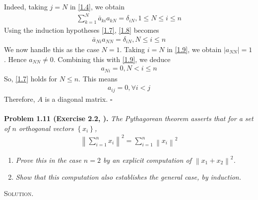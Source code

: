 \documentclass[a4paper,oneside]{book}
\numberwithin{equation}{chapter}
\begin{document}
Indeed, taking $j=N$ in \eqref{1.4}, we obtain
\begin{align}
\label{1.8}
\sum\limits_{k = 1}^N {{{\bar a}_{ki}}{a_{kN}}}  = {\delta _{iN}},1 \le N \le i \le n
\end{align}
Using the induction hypotheses \eqref{1.7}, \eqref{1.8} becomes
\begin{align}
\label{1.9}
{{\bar a}_{Ni}}{a_{NN}} = {\delta _{iN}},N \le i \le n
\end{align}
We now handle this as the case $N=1$. Taking $i=N$ in \eqref{1.9}, we obtain $\left| {{a_{NN}}} \right| = 1$. Hence $a_{NN} \ne 0$. Combining this with \eqref{1.9}, we deduce 
\begin{align}
{a_{Ni}} = 0,N < i \le n
\end{align}
So, \eqref{1.7} holds for $N \le n$. This means
\begin{align}
{a_{ij}} = 0,\forall i < j
\end{align}
Therefore, $A$ is a diagonal matrix. \hfill $\square$\\
\\
\textbf{Problem 1.11 (Exercise 2.2, \cite{1}).} \textit{The Pythagorean theorem asserts that for a set of $n$ orthogonal vectors $\left\{x_i\right\}$,}
\begin{align}
{\left\| {\sum\limits_{i = 1}^n {{x_i}} } \right\|^2} = \sum\limits_{i = 1}^n {{{\left\| {{x_i}} \right\|}^2}} 
\end{align}
\begin{enumerate}
\item \textit{Prove this in the case $n=2$ by an explicit computation of ${\left\| {{x_1} + {x_2}} \right\|^2}$.}
\item \textit{Show that this computation also establishes the general case, by induction.}
\end{enumerate}
\textsc{Solution.}
\end{document}
